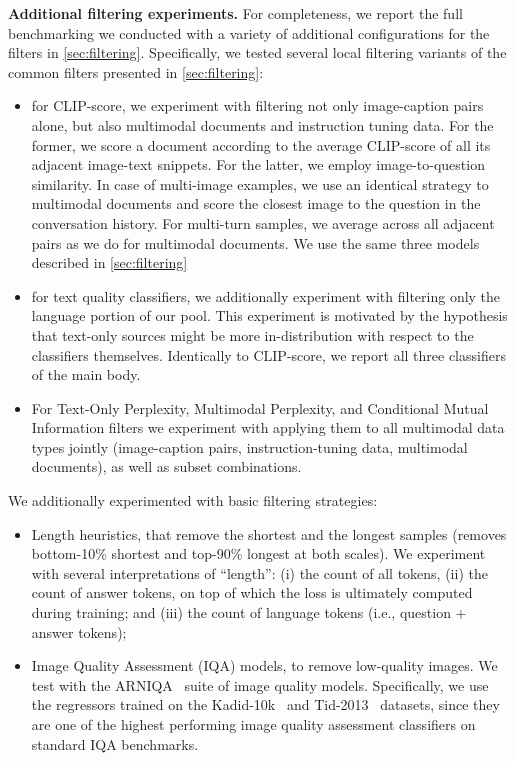 \textbf{Additional filtering experiments.} For completeness, we report the full benchmarking we conducted with a variety of additional configurations for the filters in \cref{sec:filtering}. 
Specifically, we tested several local filtering variants of the common filters presented in \cref{sec:filtering}:
\begin{itemize}[leftmargin=*, itemsep=2pt, topsep=0pt, parsep=0pt, partopsep=0pt]
    \item for CLIP-score, we experiment with filtering not only image-caption pairs alone, but also multimodal documents and instruction tuning data. For the former, we score a document according to the average CLIP-score of all its adjacent image-text snippets. For the latter, we employ image-to-question similarity. In case of multi-image examples, we use an identical strategy to multimodal documents and score the closest image to the question in the conversation history. For multi-turn samples, we average across all adjacent pairs as we do for multimodal documents. We use the same three models described in \cref{sec:filtering}
    \item for text quality classifiers, we additionally experiment with filtering only the language portion of our pool. This experiment is motivated by the hypothesis that text-only sources might be more in-distribution with respect to the classifiers themselves. Identically to CLIP-score, we report all three classifiers of the main body.
    \item For Text-Only Perplexity, Multimodal Perplexity, and Conditional Mutual Information filters we experiment with applying them to all multimodal data types jointly (image-caption pairs, instruction-tuning data, multimodal documents), as well as subset combinations. 
\end{itemize}

We additionally experimented with basic filtering strategies:
\begin{itemize}[leftmargin=*, itemsep=2pt, topsep=0pt, parsep=0pt, partopsep=0pt]
    \item Length heuristics, that remove the shortest and the longest samples (removes bottom-10\% shortest and top-90\% longest at both scales). We experiment with several interpretations of ``length'': (i) the count of all tokens, (ii) the count of answer tokens, on top of which the loss is ultimately computed during training; and (iii) the count of language tokens (i.e., question + answer tokens); 
    \item Image Quality Assessment (IQA) models, to remove low-quality images. We test with the ARNIQA~\citep{agnolucci2024arniqa} suite of image quality models. Specifically, we use the regressors trained on the Kadid-10k~\citep{lin2019kadid} and Tid-2013~\citep{ponomarenko2013color} datasets, since they are one of the highest performing image quality assessment classifiers on standard IQA benchmarks.  
\end{itemize}



